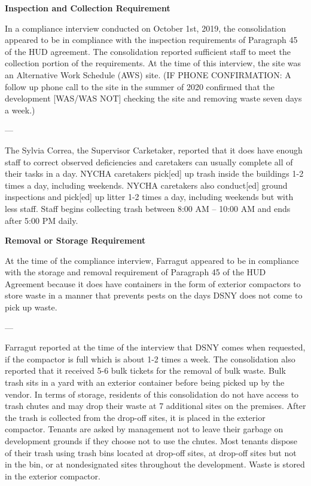 

\textbf{Inspection and Collection Requirement}

In a compliance interview conducted on October 1st, 2019, the consolidation appeared to be in compliance with the inspection requirements of Paragraph 45 of the HUD agreement. The consolidation reported sufficient staff to meet the collection portion of the requirements. At the time of this interview, the site was an Alternative Work Schedule (AWS) site. (IF PHONE CONFIRMATION: A follow up phone call to the site in the summer of 2020 confirmed that the development [WAS/WAS NOT] checking the site and removing waste seven days a week.)

---

The Sylvia Correa, the Supervisor Carketaker, reported that it does have enough staff to correct observed deficiencies and caretakers can usually complete all of their tasks in a day. NYCHA caretakers pick[ed] up trash inside the buildings 1-2 times a day, including weekends. NYCHA caretakers also conduct[ed] ground inspections and pick[ed] up litter 1-2 times a day, including weekends but with less staff. Staff begins collecting trash between 8:00 AM -- 10:00 AM and ends after 5:00 PM daily. 

\textbf{Removal or Storage Requirement}

At the time of the compliance interview, Farragut appeared to be in compliance with the storage and removal requirement of Paragraph 45 of the HUD Agreement because it does have containers in the form of exterior compactors to store waste in a manner that prevents pests on the days DSNY does not come to pick up waste.

---

Farragut reported at the time of the interview that DSNY comes when requested, if the compactor is full which is about 1-2 times a week. The consolidation also reported that it received 5-6 bulk tickets for the removal of bulk waste. Bulk trash sits in a yard with an exterior container before being picked up by the vendor. In terms of storage, residents of this consolidation do not have access to trash chutes and may drop their waste at 7 additional sites on the premises. After the trash is collected from the drop-off sites, it is placed in the exterior compactor. Tenants are asked by management not to leave their garbage on development grounds if they choose not to use the chutes. Most tenants dispose of their trash using trash bins located at drop-off sites, at drop-off sites but not in the bin, or at nondesignated sites throughout the development. Waste is stored in the exterior compactor. 

